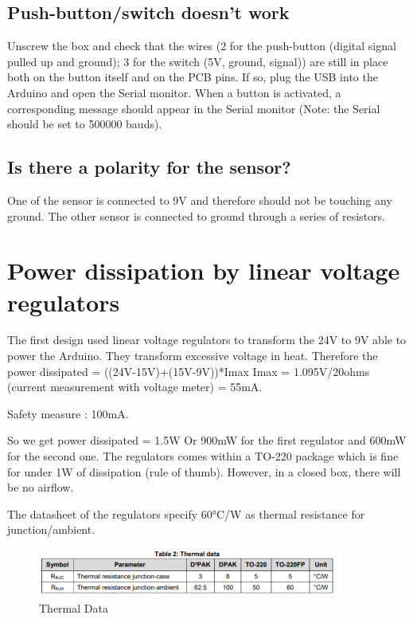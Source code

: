 \documentclass[a4paper]{article}
\begin{document}
\subsection{Push-button/switch doesn't work}
Unscrew the box and check that the wires (2 for the push-button (digital signal pulled up and ground); 3 for the switch (5V, ground, signal)) are still in place both on the button itself and on the PCB pins.
If so, plug the USB into the Arduino and open the Serial monitor. When a button is activated, a corresponding message should appear in the Serial monitor (Note: the Serial should be set to 500000 bauds).

\subsection{Is there a polarity for the sensor?}
One of the sensor is connected to 9V and therefore should not be touching any ground. 
The other sensor is connected to ground through a series of resistors.


\newpage
\appendix
\section{Power dissipation by linear voltage regulators}
The first design used linear voltage regulators to transform the 24V to 9V able to power the Arduino.
They transform excessive voltage in heat.
Therefore the power dissipated = ((24V-15V)+(15V-9V))*Imax
Imax =  1.095V/20ohms (current measurement with voltage meter) = 55mA.

Safety measure : 100mA.

So we get power dissipated = 1.5W
Or 900mW for the first regulator and 600mW for the second one.
The regulators comes within a TO-220 package which is fine for under 1W of dissipation (rule of thumb). However, in a closed box, there will be no airflow.

The datasheet of the regulators specify 60°C/W as thermal resistance for junction/ambient.

\begin{figure}[h!]
    \centering
    \includegraphics[width = 10cm]{images/thermalData.png}
    \caption{Thermal Data}
    \label{fig:thermalData}
\end{figure}
\end{document}
